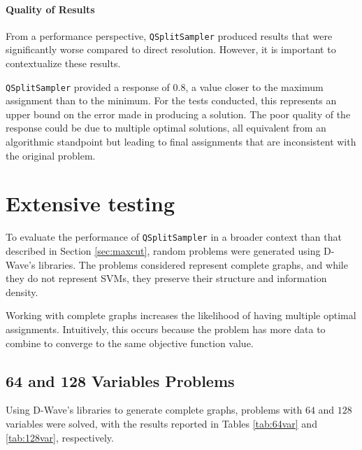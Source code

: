 \paragraph{Quality of Results} From a performance perspective, \texttt{QSplitSampler} produced results that were significantly worse compared to direct resolution. 
However, it is important to contextualize these results.

\texttt{QSplitSampler} provided a response of $0.8$, a value closer to the maximum assignment than to the minimum. 
For the tests conducted, this represents an upper bound on the error made in producing a solution. 
The poor quality of the response could be due to multiple optimal solutions, all equivalent from an algorithmic standpoint but leading to final assignments that are inconsistent with the original problem.

\section{Extensive testing}\label{sec:qsplittest}

To evaluate the performance of \texttt{QSplitSampler} in a broader context than that described in Section \ref{sec:maxcut}, random problems were generated using D-Wave's libraries. 
The problems considered represent complete graphs, and while they do not represent SVMs, they preserve their structure and information density.

Working with complete graphs increases the likelihood of having multiple optimal assignments. 
Intuitively, this occurs because the problem has more data to combine to converge to the same objective function value.

\subsection{64 and 128 Variables Problems}\label{sec:multivar}

Using D-Wave's libraries to generate complete graphs, problems with $64$ and $128$ variables were solved, with the results reported in Tables \ref{tab:64var} and \ref{tab:128var}, respectively.

